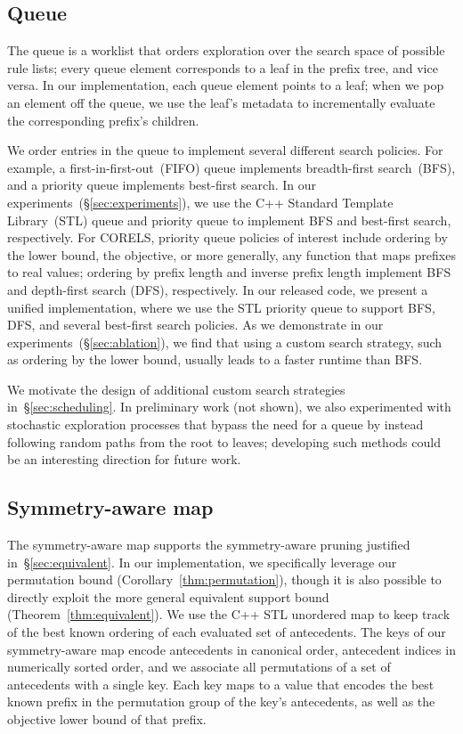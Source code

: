 \subsection{Queue}
\label{sec:queue}

The queue is a worklist that orders exploration over the search space of possible
rule lists; every queue element corresponds to a leaf in the prefix tree, and vice versa.
%
In our implementation, each queue element points to a leaf;
when we pop an element off the queue, we use the leaf's metadata to
incrementally evaluate the corresponding prefix's children.

We order entries in the queue to implement several different search policies.
%
For example, a first-in-first-out~(FIFO) queue implements breadth-first search~(BFS),
and a priority queue implements best-first search.
%
In our experiments~(\S\ref{sec:experiments}), we use the C++ Standard Template Library~(STL)
queue and priority queue to implement BFS and best-first search, respectively.
%
For CORELS, priority queue policies of interest include ordering by the lower bound,
the objective, or more generally, any function that maps prefixes to real values;
ordering by prefix length and inverse prefix length implement
BFS and depth-first search (DFS), respectively.
%
In our released code, we present a unified implementation,
where we use the STL priority queue to support BFS, DFS,
and several best-first search policies.
%
As we demonstrate in our experiments~(\S\ref{sec:ablation}),
we find that using a custom search strategy,
such as ordering by the lower bound, usually leads to a faster runtime than BFS.

We motivate the design of additional custom search strategies in~\S\ref{sec:scheduling}.
%
In preliminary work (not shown), we also experimented with
stochastic exploration processes that bypass the need for a queue
by instead following random paths from the root to leaves;
developing such methods could be an interesting direction for future work.

\subsection{Symmetry-aware map}
\label{sec:pmap}

The symmetry-aware map supports the symmetry-aware pruning justified in~\S\ref{sec:equivalent}.
%
In our implementation, we specifically leverage our permutation bound
(Corollary~\ref{thm:permutation}), though it is also possible to directly
exploit the more general equivalent support bound (Theorem~\ref{thm:equivalent}).
%
We use the C++ STL unordered map to keep track of the best known ordering
of each evaluated set of antecedents.
%
The keys of our symmetry-aware map encode antecedents in canonical order,
\ie antecedent indices in numerically sorted order,
and we associate all permutations of a set of antecedents with a single key.
%
Each key maps to a value that encodes the best known prefix in the permutation
group of the key's antecedents, as well as the objective lower bound of that prefix.

